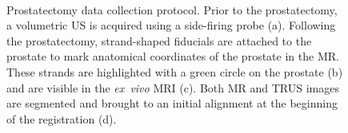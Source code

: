 \documentclass[journal]{IEEEtran}
\begin{document}
\begin{figure}[t]
	\centering
	\\
\caption{Prostatectomy data collection protocol. Prior to the prostatectomy, a volumetric US is acquired using a side-firing probe (a). Following the prostatectomy, strand-shaped fiducials are attached to the prostate to mark anatomical coordinates of the prostate in the MR. These strands are highlighted with a green circle on the prostate (b) and are visible in the \textit{ex~vivo} MRI (c). Both MR and TRUS images are segmented and brought to an initial alignment at the beginning of the registration (d). \label{fig:prostatectomyData}}
\end{figure}
\end{document}
